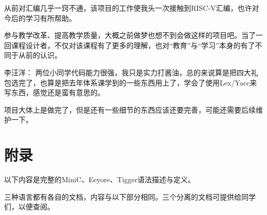 \documentclass{ctexart}
\begin{document}
从前对汇编几乎一窍不通，该项目的工作使我头一次接触到RISC-V汇编，也许对今后的学习有所帮助。

参与教学改革、提高教学质量，大概之前做梦也想不到会做这样的项目吧。当了一回课程设计者，不仅对该课程有了更多的理解，也对“教育”与“学习”本身的有了不同于从前的认识。

\bigskip
\noindent 李汪洋：
两位小同学代码能力很强，我只是实力打酱油，总的来说算是把四大礼包选完了，也算是把去年体系课学到的一些东西用上了，学会了使用Lex/Yacc来写东西，感觉还是蛮有意思的。

项目大体上是做完了，但是还有一些细节的东西应该还要完善，可能还需要后续维护一下。

\newpage
\section{附录}
以下内容是完整的MiniC、Eeyore、Tigger语法描述与定义。

三种语言都有各自的文档，内容与以下部分相同。三个分离的文档可提供给同学们，以便查阅。

\newpage

\newpage

\end{document}

